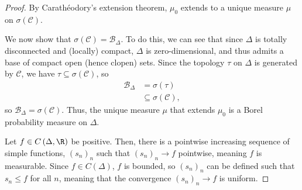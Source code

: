 \documentclass[10pt]{mypackage}
\begin{document}
\begin{proof}
  By Carathéodory's extension theorem, $\mu_0$ extends to a unique measure $\mu$ on $\sigma\left(\mathcal{C}\right)$.\newline

  We now show that $\sigma\left(\mathcal{C}\right) = \mathcal{B}_{\Delta}$. To do this, we can see that since $\Delta$ is totally disconnected and (locally) compact, $\Delta$ is zero-dimensional, and thus admits a base of compact open (hence clopen) sets. Since the topology $\tau$ on $\Delta$ is generated by $\mathcal{C}$, we have $\tau\subseteq \sigma\left(\mathcal{C}\right)$, so
  \begin{align*}
    \mathcal{B}_{\Delta} &= \sigma\left(\tau\right)\\
                         &\subseteq \sigma\left(\mathcal{C}\right),
  \end{align*}
  so $\mathcal{B}_{\Delta} = \sigma\left(\mathcal{C}\right)$. Thus, the unique measure $\mu$ that extends $\mu_0$ is a Borel probability measure on $\Delta$.\newline

  Let $f\in C\left(\Delta,\R\right)$ be positive. Then, there is a pointwise increasing sequence of simple functions, $\left(s_n\right)_n$ such that $\left(s_n\right)_n\rightarrow f$ pointwise, meaning $f$ is measurable. Since $f\in C\left(\Delta\right)$, $f$ is bounded, so $\left(s_n\right)_n$ can be defined such that $s_n \leq f$ for all $n$, meaning that the convergence $\left(s_n\right)_n\rightarrow f$ is uniform.\newline


\end{proof}
\end{document}
